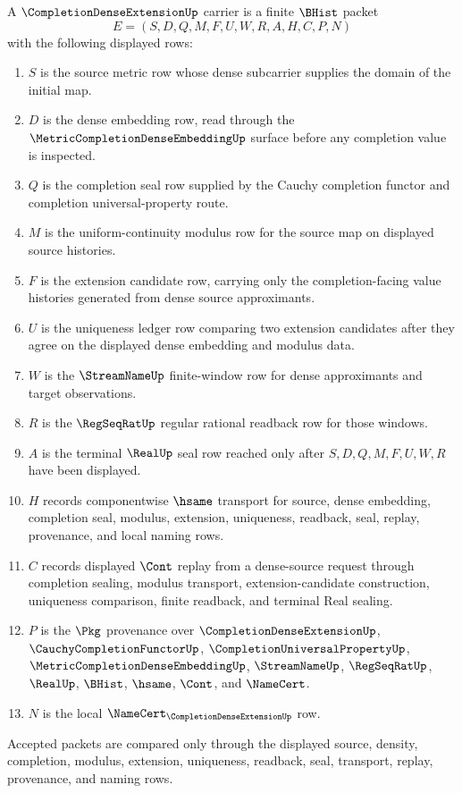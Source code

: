 \begin{definition}
\label{def:completion-dense-extension-carrier}
A $\CompletionDenseExtensionUp$ carrier is a finite $\BHist$ packet
$$
E=(S,D,Q,M,F,U,W,R,A,H,C,P,N)
$$
with the following displayed rows:
\begin{enumerate}
\item $S$ is the source metric row whose dense subcarrier supplies the domain of the initial map.
\item $D$ is the dense embedding row, read through the $\MetricCompletionDenseEmbeddingUp$ surface before any completion value is inspected.
\item $Q$ is the completion seal row supplied by the Cauchy completion functor and completion universal-property route.
\item $M$ is the uniform-continuity modulus row for the source map on displayed source histories.
\item $F$ is the extension candidate row, carrying only the completion-facing value histories generated from dense source approximants.
\item $U$ is the uniqueness ledger row comparing two extension candidates after they agree on the displayed dense embedding and modulus data.
\item $W$ is the $\StreamNameUp$ finite-window row for dense approximants and target observations.
\item $R$ is the $\RegSeqRatUp$ regular rational readback row for those windows.
\item $A$ is the terminal $\RealUp$ seal row reached only after $S,D,Q,M,F,U,W,R$ have been displayed.
\item $H$ records componentwise $\hsame$ transport for source, dense embedding, completion seal, modulus, extension, uniqueness, readback, seal, replay, provenance, and local naming rows.
\item $C$ records displayed $\Cont$ replay from a dense-source request through completion sealing, modulus transport, extension-candidate construction, uniqueness comparison, finite readback, and terminal Real sealing.
\item $P$ is the $\Pkg$ provenance over $\CompletionDenseExtensionUp$, $\CauchyCompletionFunctorUp$, $\CompletionUniversalPropertyUp$, $\MetricCompletionDenseEmbeddingUp$, $\StreamNameUp$, $\RegSeqRatUp$, $\RealUp$, $\BHist$, $\hsame$, $\Cont$, and $\NameCert$.
\item $N$ is the local $\NameCert_{\CompletionDenseExtensionUp}$ row.
\end{enumerate}
Accepted packets are compared only through the displayed source, density, completion, modulus, extension, uniqueness, readback, seal, transport, replay, provenance, and naming rows.
\end{definition}

